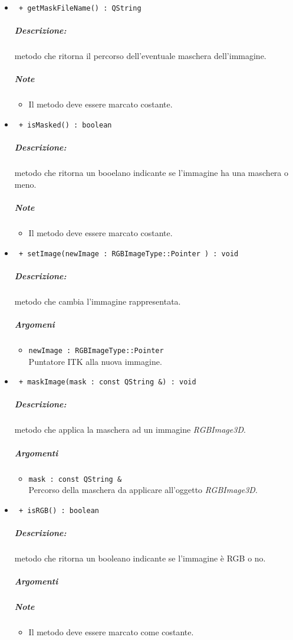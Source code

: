 \begin{itemize}
	\item \color{blue}\verb! + getMaskFileName() : QString!\\
	\color{black}
	\subparagraph{Descrizione:} metodo che ritorna il percorso dell'eventuale maschera\g{} dell'immagine.
	\subparagraph{Note}
		\begin{itemize}
			\item Il metodo deve essere marcato costante.
		\end{itemize}
		
	\item \color{blue}\verb! + isMasked() : boolean!\\
	\color{black}
	\subparagraph{Descrizione:} metodo che ritorna un booelano indicante se l'immagine ha una maschera o meno.
	\subparagraph{Note}
			\begin{itemize}
				\item Il metodo deve essere marcato costante.
			\end{itemize}
	
	\item \color{blue}\verb! + setImage(newImage : RGBImageType::Pointer ) : void!\\
	\color{black}
	\subparagraph{Descrizione:} metodo che cambia l'immagine rappresentata.
	\subparagraph{Argomeni}
		\begin{itemize}
			\item \color{RoyalPurple}\verb!newImage : RGBImageType::Pointer!\\
			\color{black}Puntatore ITK\g{} alla nuova immagine.
		\end{itemize}
		
	\item \color{blue}\verb! + maskImage(mask : const QString &) : void!\\
	\color{black}
	\subparagraph{Descrizione:} metodo che applica la maschera ad un immagine \textsl{RGBImage3D}.
	\subparagraph{Argomenti}
		\begin{itemize}
			\item \color{RoyalPurple}\verb!mask : const QString &!\\
			\color{black}Percorso della maschera\g{} da applicare all'oggetto \textsl{RGBImage3D}. 
		\end{itemize}
		
	\item \color{blue}\verb! + isRGB() : boolean!\\
	\color{black}
	\subparagraph{Descrizione:} metodo che ritorna un booleano indicante se l'immagine è RGB o no.
	\subparagraph{Argomenti}
	\subparagraph{Note}
			\begin{itemize}
				\item Il metodo deve essere marcato come costante.
			\end{itemize}
	

\end{itemize}
